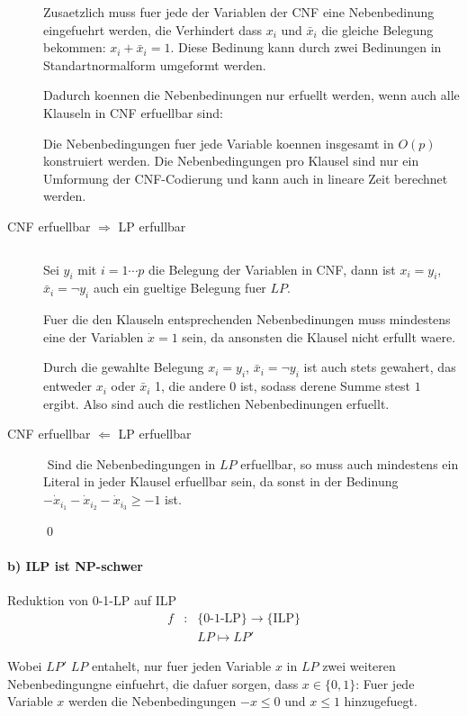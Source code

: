\begin{description}
Zusaetzlich muss fuer jede der Variablen der CNF eine Nebenbedinung eingefuehrt werden,
die Verhindert dass $x_i$ und $\bar x_i$ die gleiche Belegung bekommen:
$x_i + \bar x_i = 1$. Diese Bedinung kann durch zwei Bedinungen in Standartnormalform umgeformt werden.

Dadurch koennen die Nebenbedinungen nur erfuellt werden, wenn auch alle Klauseln in CNF erfuellbar sind:

Die Nebenbedingungen fuer jede Variable koennen insgesamt in $O(p)$ konstruiert werden.
Die Nebenbedingungen pro Klausel sind nur ein Umformung der CNF-Codierung und kann
auch in lineare Zeit berechnet werden.

\item[CNF erfuellbar $\Rightarrow$ LP erfullbar] $ $

Sei $y_i$ mit $i=1 \cdots p$ die Belegung der Variablen in CNF,
dann ist $x_i = y_i$, $\bar x_i = \lnot y_i$ auch ein gueltige Belegung fuer $LP$.

Fuer die den Klauseln entsprechenden Nebenbedinungen muss mindestens eine
der Variablen $\dot x = 1$ sein, da ansonsten die Klausel nicht erfullt waere.

Durch die gewahlte Belegung  $x_i = y_i$, $\bar x_i = \lnot y_i$ ist auch stets gewahert,
das entweder $x_i$ oder $\bar x_i$ 1, die andere 0 ist, sodass derene Summe stest $1$ ergibt.
Also sind auch die restlichen Nebenbedinungen erfuellt.

\item[CNF erfuellbar $\Leftarrow$ LP erfuellbar] $ $
Sind die Nebenbedingungen in $LP$ erfuellbar, so muss auch mindestens ein Literal in jeder 
Klausel erfuellbar sein, da sonst in der Bedinung $-\dot x_{i_1} - \dot x_{i_2} - \dot x_{i_3}\geq -1$
ist.

\qed

\end{description}


\paragraph{b) ILP ist NP-schwer} Reduktion von 0-1-LP auf ILP
\begin{eqnarray}
f &:& \{\text{0-1-LP}\} \to \{\text{ILP}\} \\
  && LP \mapsto LP'
\end{eqnarray}

Wobei $LP'$ $LP$ entahelt, nur fuer jeden Variable $x$ in $LP$
zwei weiteren Nebenbedingungne einfuehrt, die dafuer sorgen,
dass $x \in \{0,1\}$:
Fuer jede Variable $x$ werden die Nebenbedingungen $-x \leq 0$ und $x \leq 1$
hinzugefuegt.

